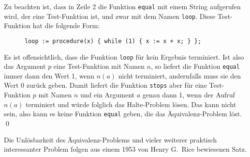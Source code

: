 Zu beachten ist, dass in Zeile 2 die Funktion \texttt{equal} mit einem String aufgerufen
wird, der eine Test-Funktion ist, und zwar mit dem Namen \texttt{loop}.  Diese 
Test-Funktion hat die
folgende Form:
\begin{verbatim}
      loop := procedure(x) { while (1) { x := x + x; } };
\end{verbatim}
Es ist offensichtlich, dass die Funktion \texttt{loop} f\"ur kein Ergebnis terminiert.
Ist also das Argument $p$ eine Test-Funktion mit Namen $n$, so liefert die Funktion
\texttt{equal} immer dann den Wert 1, 
wenn $n(a)$ nicht terminiert, andernfalls muss sie den Wert 0 zur\"uck geben.
Damit liefert die Funktion \texttt{stops} aber f\"ur eine Test-Funktion $p$ mit Namen $n$
und ein Argument 
$a$ genau dann 1, wenn der Aufruf $n(a)$ terminiert und w\"urde folglich das Halte-Problem
l\"osen.  Das kann nicht sein, also kann es keine Funktion  \texttt{equal}
geben, die das Äquivalenz-Problem l\"ost. 
\qed
\vspace*{0.3cm}

\noindent
Die Unl\"osbarkeit des Äquivalenz-Problems und vieler weiterer praktisch interessanter
Problem folgen aus einem 1953 von Henry G.~Rice \cite{rice:53} bewiesenen Satz.



